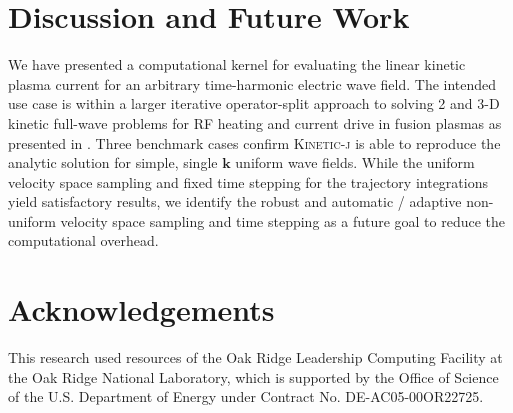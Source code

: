 \documentclass[final,5p,times,twocolumn]{elsarticle}
\renewcommand{\vec}[1]{\mathbf{#1}}
\newcommand{\kj}{\textsc{Kinetic-j}\xspace}
\begin{document}
\section{Discussion and Future Work}
\label{section:discussion}
%
We have presented a computational kernel for evaluating the linear kinetic plasma current for an arbitrary time-harmonic electric wave field. The intended use case is within a larger iterative operator-split approach to solving 2 and 3-D kinetic full-wave problems for RF heating and current drive in fusion plasmas as presented in \cite{green2014}. Three benchmark cases confirm \kj is able to reproduce the analytic solution for simple, single $\vec{k}$ uniform wave fields. While the uniform velocity space sampling and fixed time stepping for the trajectory integrations yield satisfactory results, we identify the robust and automatic / adaptive non-uniform velocity space sampling and time stepping as a future goal to reduce the computational overhead. 
%
\section{Acknowledgements}
\label{section:acknowledgements}
This research used resources of the Oak Ridge Leadership Computing Facility at the Oak Ridge National Laboratory, which is supported by the Office of Science of the U.S. Department of Energy under Contract No. DE-AC05-00OR22725.














\end{document}
